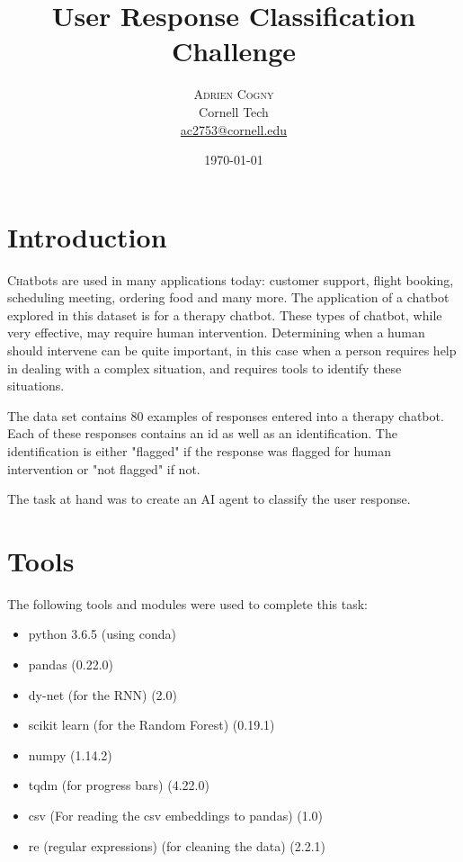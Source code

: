 \documentclass[twoside,twocolumn]{article}
\title{User Response Classification Challenge} %
\author{%
\textsc{Adrien Cogny} \\%
\normalsize Cornell Tech \\ %
\normalsize \href{mailto:ac2753@cornell.edu}{ac2753@cornell.edu} %
}
\date{\today} %
\begin{document}
\maketitle


\section{Introduction}

\lettrine[nindent=0em,lines=3]{C}hatbots are used in many applications today: customer support,
flight booking, scheduling meeting, ordering food and many more. The application of a chatbot
 explored in this dataset is for a therapy chatbot. These types of chatbot, while very effective,
 may require human intervention. Determining when a human should intervene can be quite important,
 in this case when a person requires help in dealing with a complex situation, and requires tools
 to identify these situations. 

The data set contains 80 examples of responses entered into a therapy chatbot. Each of these responses
contains an id as well as an identification. The identification is either "flagged" if the response
was flagged for human intervention or "not flagged" if not.

The task at hand was to create an AI agent to classify the user response. 

\section{Tools}

The following tools and modules were used to complete this task:
\begin{itemize}
\item python 3.6.5 (using conda)
\item pandas (0.22.0)
\item dy-net (for the RNN) (2.0)
\item scikit learn (for the Random Forest) (0.19.1)
\item numpy (1.14.2)
\item tqdm (for progress bars) (4.22.0)
\item csv (For reading the csv embeddings to pandas) (1.0)
\item re (regular expressions) (for cleaning the data) (2.2.1)
\end{itemize}
 
\end{document}
